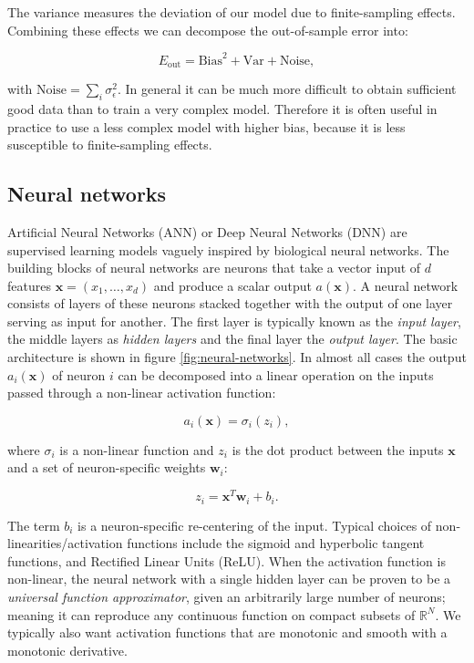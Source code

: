The variance measures the deviation of our model due to finite-sampling effects.
Combining these effects we can decompose the out-of-sample error into:

\begin{equation}
    E_{\text{out}} = \text{Bias}^2 + \text{Var} + \text{Noise},
\end{equation}

with $\text{Noise} = \sum_i \sigma_{\epsilon}^2$.
In general it can be much more difficult to obtain sufficient good data
than to train a very complex model. Therefore it is often useful in practice
to use a less complex model with higher bias, because it is less susceptible
to finite-sampling effects.

\subsection{Neural networks}
Artificial Neural Networks (ANN) or Deep Neural Networks (DNN) are
supervised learning models vaguely inspired by biological neural networks.
The building blocks of neural networks are neurons that take a
vector input of $d$ features $\bm{x} = (x_1,\dots,x_d)$
and produce a scalar output $a(\bm{x})$.
A neural network consists of layers of these neurons stacked together
with the output of one layer serving as input for another. The
first layer is typically known as the \textit{input layer}, the
middle layers as \textit{hidden layers} and the final layer
the \textit{output layer}. The basic architecture is shown in
figure \ref{fig:neural-networks}.
In almost all cases the output $a_i(\bm{x})$ of neuron $i$ can be decomposed
into a linear operation on the inputs passed through a non-linear
activation function:

\begin{equation}
 a_i(\bm{x}) = \sigma_i(z_i) ,
\end{equation}

where $\sigma_i$ is a non-linear function and $z_i$
is the dot product between the inputs $\bm{x}$ and a set of
neuron-specific weights $\bm{w}_i$:

\begin{equation}
 z_i = \bm{x}^T \bm{w}_i + b_i .
\end{equation}

The term $b_i$ is a neuron-specific re-centering of the input.
Typical choices of non-linearities/activation functions include
the sigmoid and hyperbolic tangent functions, and Rectified Linear Units (ReLU).
When the activation function is non-linear, the neural network with a single hidden
layer can be proven to be a \textit{universal function approximator},
given an arbitrarily large number of neurons; meaning
it can reproduce any continuous function on compact subsets of $\mathbb{R}^N$. We typically also
want activation functions that are monotonic and smooth with a monotonic derivative.

